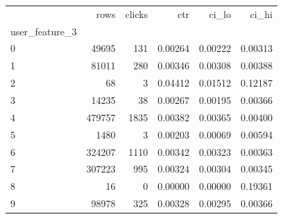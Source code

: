 \begin{tabular}{lrrrrr}
\toprule
 & rows & clicks & ctr & ci\_lo & ci\_hi \\
user\_feature\_3 &  &  &  &  &  \\
\midrule
0 & 49695 & 131 & 0.00264 & 0.00222 & 0.00313 \\
1 & 81011 & 280 & 0.00346 & 0.00308 & 0.00388 \\
2 & 68 & 3 & 0.04412 & 0.01512 & 0.12187 \\
3 & 14235 & 38 & 0.00267 & 0.00195 & 0.00366 \\
4 & 479757 & 1835 & 0.00382 & 0.00365 & 0.00400 \\
5 & 1480 & 3 & 0.00203 & 0.00069 & 0.00594 \\
6 & 324207 & 1110 & 0.00342 & 0.00323 & 0.00363 \\
7 & 307223 & 995 & 0.00324 & 0.00304 & 0.00345 \\
8 & 16 & 0 & 0.00000 & 0.00000 & 0.19361 \\
9 & 98978 & 325 & 0.00328 & 0.00295 & 0.00366 \\
\bottomrule
\end{tabular}
